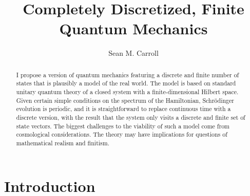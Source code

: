 \documentclass[aps,prd,twocolumn,nofootinbib,notitlepage]{revtex4-1}
\begin{document}
\thispagestyle{empty}

\newcommand{\be}{\begin{equation}}
\newcommand{\ee}{\end{equation}}
\newcommand{\bea}{\begin{eqnarray}}
\newcommand{\eea}{\end{eqnarray}}
\newcommand{\hst}{\widetilde{\mathcal{H}}} 
\newcommand{\iso}{\dot{=}}
\newcommand{\Dim}{\textrm{dim\,}}
\newcommand{\Tr}{\textrm{Tr\,}}
\newcommand{\hs}{\mathcal{H}} 
\newcommand{\E}{\widetilde{E}}
\newcommand{\thetat}{\tilde{\theta}}
\newcommand{\ham}{\widehat{H}}
\newcommand{\intham}{\widehat{H}_{\rm{int}}}
\newcommand{\selfham}{\widehat{H}_{\rm{self}}}
\newcommand{\dt}{\delta_t}
\newcommand{\trace}{\mathrm{Tr}}
\def\bra#1{\langle #1\rvert}
\def\ket#1{\lvert #1\rangle}
\newcommand{\draftnote}[1]{\textbf{\color{red}[#1]}}

\baselineskip=14pt


\title{Completely Discretized, Finite Quantum Mechanics}
\author{Sean M. Carroll}

\begin{abstract}
I propose a version of quantum mechanics featuring a discrete and finite number of states that is plausibly a model of the real world.
The model is based on standard unitary quantum theory of a closed system with a finite-dimensional Hilbert space.
Given certain simple conditions on the spectrum of the Hamiltonian, Schr\"odinger evolution is periodic, and it is straightforward to replace continuous time with a discrete version, with the result that the system only visits a discrete and finite set of state vectors.
The biggest challenges to the viability of such a model come from cosmological considerations.
The theory may have implications for questions of mathematical realism and finitism.
\end{abstract}

\maketitle

\section{Introduction}
\end{document}
